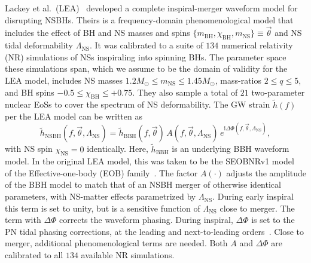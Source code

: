 \documentclass[aps,prd,amsmath,floats,floatfix, twocolumn,
superscriptaddress,nofootinbib,showpacs]{revtex4-1}
\newcommand{\lambdans}{\Lambda_\mathrm{NS}}
\newcommand{\ii}{\mathrm{i}}
\newcommand{\chibh}{\chi_\mathrm{BH}}
\newcommand{\chins}{\chi_\mathrm{NS}}
\newcommand{\mbh}{m_\mathrm{BH}}
\newcommand{\mns}{m_\mathrm{NS}}
\begin{document}
Lackey et al.~(LEA)~\cite{Lackey:2013axa} developed a complete inspiral-merger
waveform model for disrupting NSBHs. Theirs is a frequency-domain
phenomenological model that includes the effect of BH and NS masses and spins
$\{\mbh, \chibh, \mns\}\equiv\vec{\theta}$ and NS tidal deformability
$\lambdans$. It was calibrated to a suite of $134$ numerical relativity (NR)
simulations of NSs inspiraling into spinning BHs. The parameter space these
simulations span, which we assume to be the domain of validity for the LEA
model, includes NS masses $1.2M_\odot\leq\mns\leq 1.45M_\odot$,
mass-ratios $2\leq q\leq 5$, and BH spins $-0.5\leq\chibh\leq+0.75$.
They also sample a total of $21$ two-parameter nuclear EoSs to cover the
spectrum of NS deformability.
% 
% 
The GW strain $\tilde{h}(f)$ per the LEA model can be written as
\begin{equation}
 \tilde{h}_\mathrm{NSBH}(f, \vec{\theta}, \lambdans) = \tilde{h}_\mathrm{BBH}(f, \vec{\theta})\,A(f, \vec{\theta}, \lambdans)\,e^{\ii \Delta\Phi(f, \vec{\theta}, \lambdans)},
\end{equation}
with NS spin $\chins=0$ identically. Here, $\tilde{h}_\mathrm{BBH}$ is
an underlying BBH waveform model. In the original LEA model,
this was taken to be the SEOBNRv1
model~\cite{Taracchini:2012} of the Effective-one-body (EOB)
family~\cite{Buonanno99}. The factor $A(\cdot)$ adjusts
the amplitude of the BBH model to match that of an NSBH merger of otherwise
identical parameters, with NS-matter effects parametrized by $\lambdans$.
During early inspiral this term is set to
unity, but is a sensitive function of $\lambdans$ close to merger. The term with
$\Delta\Phi$ corrects the waveform phasing. During inspiral,
$\Delta\Phi$ is set to the PN tidal phasing corrections,
at the leading and next-to-leading orders~\cite{Vines2011}. Close to merger,
additional phenomenological terms are needed. Both $A$ and $\Delta\Phi$ are
calibrated to all $134$ available NR simulations.
\end{document}
